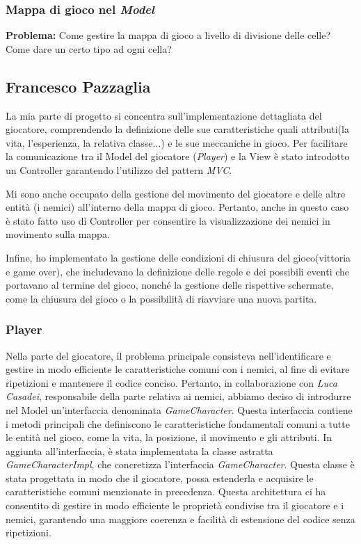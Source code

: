 \documentclass[a4paper,12pt]{report}
\begin{document}
\subsubsection{Mappa di gioco nel \textit{Model}}
\textbf{Problema:} Come gestire la mappa di gioco a livello di divisione delle celle? Come dare un certo tipo ad ogni cella?

\subsection*{Francesco Pazzaglia}
La mia parte di progetto si concentra sull'implementazione dettagliata del giocatore, comprendendo la definizione delle sue caratteristiche quali attributi(la vita, l'esperienza, la relativa classe...) e le sue meccaniche in gioco. Per facilitare la comunicazione tra il Model del giocatore (\textit{Player}) e la View è stato introdotto un Controller garantendo l'utilizzo del pattern \textit{MVC}.

Mi sono anche occupato della gestione del movimento del giocatore e delle altre entità (i nemici) all'interno della mappa di gioco. Pertanto, anche in questo caso è stato fatto uso di Controller per consentire la visualizzazione dei nemici in movimento sulla mappa.

Infine, ho implementato la gestione delle condizioni di chiusura del gioco(vittoria e game over), che includevano la definizione delle regole e dei possibili eventi che portavano al termine del gioco, nonché la gestione delle rispettive schermate, come la chiusura del gioco o la possibilità di riavviare una nuova partita.

\subsubsection{Player}
Nella parte del giocatore, il problema principale consisteva nell'identificare e gestire in modo efficiente le caratteristiche comuni con i nemici, al fine di evitare ripetizioni e mantenere il codice conciso. 
Pertanto, in collaborazione con \textit{Luca Casadei}, responsabile della parte relativa ai nemici, abbiamo deciso di introdurre nel Model un'interfaccia denominata \textit{GameCharacter}. Questa interfaccia contiene i metodi principali che definiscono le caratteristiche fondamentali comuni a tutte le entità nel gioco, come la vita, la posizione, il movimento e gli attributi.
In aggiunta all'interfaccia, è stata implementata la classe astratta \textit{GameCharacterImpl}, che concretizza l'interfaccia \textit{GameCharacter}. Questa classe è stata progettata in modo che il giocatore, possa estenderla e acquisire le caratteristiche comuni menzionate in precedenza. Questa architettura ci ha consentito di gestire in modo efficiente le proprietà condivise tra il giocatore e i nemici, garantendo una maggiore coerenza e facilità di estensione del codice senza ripetizioni.
\end{document}
